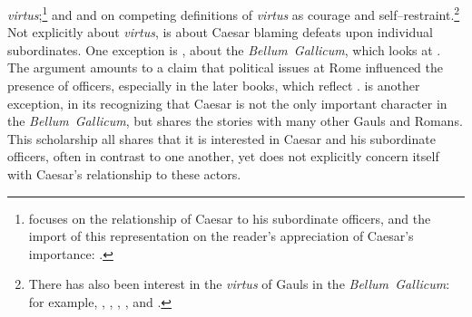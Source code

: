 \documentclass[12pt,letterpaper,oneside,final]{memoir}
\begin{document}
\emph{virtus};\footnote{\textcite{welch1998} focuses on the relationship of Caesar to his subordinate officers, and the import of this representation on the reader's appreciation of Caesar's importance: .} and \textcite[293--319]{mcdonnell2006} and \textcite[83--96]{riggsby2006} on competing definitions of \emph{virtus} as courage and self--restraint.\footnote{There has also been interest in the \emph{virtus} of Gauls in the \emph{Bellum~Gallicum}: for example, \textcite{barlow1998}, \textcite{rawlings1998}, \textcite{jervis2001}, \textcite[96--100]{riggsby2006}, and \textcite[247--251]{vasaly2009}.} Not explicitly about \emph{virtus}, \textcite[116--123]{powell1998} is about Caesar blaming defeats upon individual subordinates. One exception is \textcite{welch1998}, about the \emph{Bellum~Gallicum}, which looks at . The argument amounts to a claim that political issues at Rome influenced the presence of officers, especially in the later books, which reflect . \textcite[esp.~pp.~166--168]{kraus2009} is another exception, in its recognizing that Caesar is not the only important character in the \emph{Bellum~Gallicum}, but shares the stories with many other Gauls and Romans. This scholarship all shares that it is interested in Caesar and his subordinate officers, often in contrast to one another, yet does not explicitly concern itself with Caesar's relationship to these actors.
\end{document}
